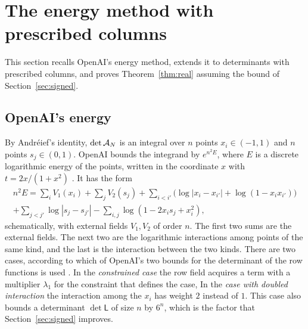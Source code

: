 \section{The energy method with prescribed columns}\label{sec:energy}

This section recalls OpenAI's energy method, extends it to determinants with prescribed columns, and
proves Theorem~\ref{thm:real} assuming the bound of Section~\ref{sec:signed}.

\subsection{OpenAI's energy}\label{ssec:energy}
By Andr\'eief's identity, $\det\mathcal A_N$ is an integral over $n$ points $x_i\in(-1,1)$ and $n$ points
$s_j\in(0,1)$. OpenAI bounds the integrand by $e^{n^2E}$, where $E$ is a discrete logarithmic energy of the
points, written in the coordinate $x$ with $t=2x/(1+x^2)$ \cite[\S5]{OpenAI2026}. It has the form
\begin{multline*}
 n^2E=\sum_iV_1(x_i)+\sum_jV_2(s_j)+\sum_{i<i'}\bigl(\log|x_i-x_{i'}|+\log(1-x_ix_{i'})\bigr)\\
 +\sum_{j<j'}\log|s_j-s_{j'}|-\sum_{i,j}\log(1-2x_is_j+x_i^2),
\end{multline*}
schematically, with external fields $V_1,V_2$ of order $n$. The first two sums are the
external fields. The next two are the logarithmic interactions among points of the same kind, and the last
is the interaction between the two kinds. There are two cases, according to which of OpenAI's two bounds for
the determinant of the row functions is used \cite[Props.~5.2, 5.3]{OpenAI2026}. In the \emph{constrained
case} the row field acquires a term with a multiplier $\lambda_1$ for the constraint that defines the case,
In the \emph{case with doubled interaction} the interaction among the $x_i$ has weight $2$ instead of $1$. This case also bounds a determinant
$\det\mathsf L$ of size $n$ by $6^n$, which is the factor that Section~\ref{sec:signed} improves.

